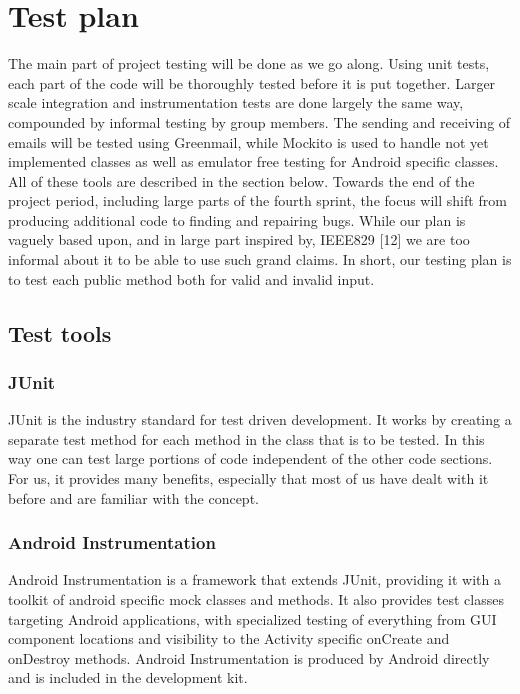 \section{Test plan}

The main part of project testing will be done as we go along. Using unit tests, each part of the code will be thoroughly tested before it is put together. Larger scale integration and instrumentation tests are done largely the same way, compounded by informal testing by group members. The sending and receiving of emails will be tested using Greenmail, while Mockito is used to handle not yet implemented classes as well as emulator free testing for Android specific classes. All of these tools are described in the section below. Towards the end of the project period, including large parts of the fourth sprint, the focus will shift from producing additional code to finding and repairing bugs. While our plan is vaguely based upon, and in large part inspired by, IEEE829 [12] we are too informal about it to be able to use such grand claims. In short, our testing plan is to test each public method both for valid and invalid input.

\subsection{Test tools}
\subsubsection{JUnit}
JUnit is the industry standard for test driven development. It works by creating a separate test method for each method in the class that is to be tested. In this way one can test large portions of code independent of the other code sections. For us, it provides many benefits, especially that most of us have dealt with it before and are familiar with the concept.

\subsubsection{Android Instrumentation}
Android Instrumentation is a framework that extends JUnit, providing it with a toolkit of android specific mock classes and methods. It also provides test classes targeting Android applications, with specialized testing of everything from GUI component locations and visibility to the Activity specific onCreate and onDestroy methods. Android Instrumentation is produced by Android directly and is included in the development kit.

